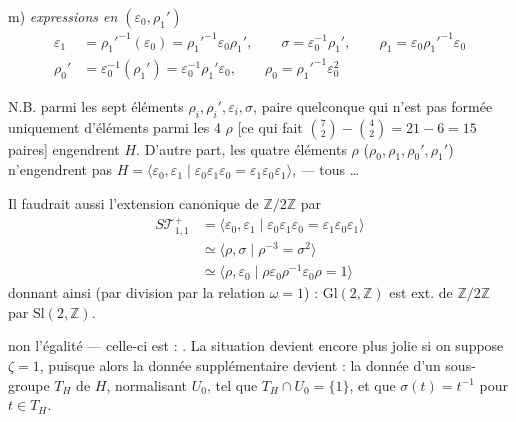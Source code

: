 \documentclass[11pt,a4paper]{article}
\begin{document}
m) \emph{expressions en $(\varepsilon_0, \rho_1')$}
\[
\begin{aligned}
\varepsilon_1 &= \rho_1'^{-1}(\varepsilon_0) = \rho_1'^{-1} \varepsilon_0 \rho_1', \qquad
\sigma = \varepsilon_0^{-1} \rho_1', \qquad
\rho_1 = \varepsilon_0 \rho_1'^{-1} \varepsilon_0 \\
\rho_0' &= \varepsilon_0^{-1}(\rho_1') = \varepsilon_0^{-1} \rho_1' \varepsilon_0, \qquad
\rho_0 = \rho_1'^{-1} \varepsilon_0^2
\end{aligned}
\]


N.B. parmi les sept éléments $\rho_i, \rho_i', \varepsilon_i, \sigma$,   paire quelconque qui n'est pas formée uniquement d'éléments parmi les 4 $\rho$ [ce qui fait $\binom{7}{2} - \binom{4}{2} = 21 - 6 = 15$ paires] engendrent $H$. D'autre part, les quatre éléments $\rho$ ($\rho_0, \rho_1, \rho_0', \rho_1'$) n'engendrent pas $H = \langle \varepsilon_0, \varepsilon_1 \mid \varepsilon_0\varepsilon_1\varepsilon_0 = \varepsilon_1\varepsilon_0\varepsilon_1 \rangle$, \ill{} \struck{$=$}  — tous \ldots

Il faudrait aussi  l'extension canonique de $\mathbb{Z}/2\mathbb{Z}$ par
\[
\begin{aligned}
S\mathcal{T}^{+}_{1,1}
&= \langle \varepsilon_0, \varepsilon_1 \mid
\varepsilon_0 \varepsilon_1 \varepsilon_0 = \varepsilon_1 \varepsilon_0 \varepsilon_1 \rangle \\
&\simeq \langle \rho, \sigma \mid \rho^{-3} = \sigma^2 \rangle \\
&\simeq \langle \rho, \varepsilon_0 \mid
\rho \varepsilon_0 \rho^{-1} \varepsilon_0 \rho = 1 \rangle
\end{aligned}
\]
donnant ainsi (par division par la relation $\omega = 1$) : $\mathrm{Gl}(2, \mathbb{Z})$ est ext. de $\mathbb{Z}/2\mathbb{Z}$ par $\mathrm{Sl}(2, \mathbb{Z})$.


non l'égalité — celle-ci est : \ill{} . La situation devient encore plus jolie si on suppose $\zeta = 1$, puisque alors la donnée supplémentaire devient : la donnée d'un sous-groupe  $T_H$ de $H$, normalisant $U_0$, tel que $T_H \cap U_0 = \{1\}$, et que $\sigma(t) = t^{-1}$ pour $t \in T_H$.
\end{document}
